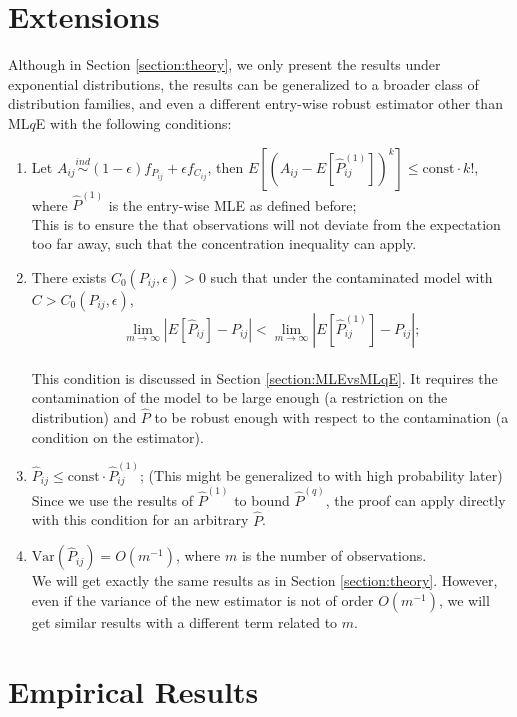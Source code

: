 \documentclass[a4paper]{article}
\renewcommand{\hat}{\widehat}
\begin{document}
\section{Extensions}
\label{section:extension}

Although in Section \ref{section:theory}, we only present the results under exponential distributions, the results can be generalized to a broader class of distribution families, and even a different entry-wise robust estimator other than ML$q$E with the following conditions:
\begin{enumerate}
\item Let $A_{ij} \stackrel{ind}{\sim} (1-\epsilon) f_{P_{ij}} + \epsilon f_{C_{ij}}$, then $E[(A_{ij} - E[\hat{P}_{ij}^{(1)}])^k] \le \mathrm{const} \cdot k!$, where $\hat{P}^{(1)}$ is the entry-wise MLE as defined before;\\
This is to ensure the that observations will not deviate from the expectation too far away, such that the concentration inequality can apply.
\item There exists $C_0(P_{ij}, \epsilon) > 0$ such that under the contaminated model with $C > C_0(P_{ij}, \epsilon)$,
\[
	\lim_{m \to \infty} \left| E[\hat{P}_{ij}] - P_{ij} \right| < 
    \lim_{m \to \infty} \left| E[\hat{P}^{(1)}_{ij}] - P_{ij} \right|;
\]\\
This condition is discussed in Section \ref{section:MLEvsMLqE}. It requires the contamination of the model to be large enough (a restriction on the distribution) and $\hat{P}$ to be robust enough with respect to the contamination (a condition on the estimator).
\item $\hat{P}_{ij} \le \mathrm{const} \cdot \hat{P}_{ij}^{(1)}$; (This might be generalized to with high probability later)\\
Since we use the results of $\hat{P}^{(1)}$ to bound $\hat{P}^{(q)}$, the proof can apply directly with this condition for an arbitrary $\hat{P}$.
\item $\mathrm{Var}(\hat{P}_{ij}) = O(m^{-1})$, where $m$ is the number of observations.\\
We will get exactly the same results as in Section \ref{section:theory}. However, even if the variance of the new estimator is not of order $O(m^{-1})$, we will get similar results with a different term related to $m$.
\end{enumerate}


\section{Empirical Results}
\label{section:results}
\end{document}
